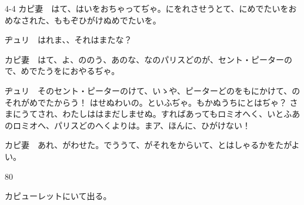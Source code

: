 \documentclass[tate,paper=b6j,jafontsize=9pt]{jlreq}
\begin{document}
\begin{azconvIndented}{4\zw}{-4\zw}
カピ妻　はて、はいをおちゃってぢゃ。にをれさせうとて、にめでたいをおめなされた、ももぞひがけぬめでたいを。

ヂュリ　はれま、、それはまたな？

カピ妻　はて、よ、ののう、あのな、なのパリスどのが、セント・ピーターので、めでたうをにおやるぢゃ。

ヂュリ　そのセント・ピーターのけて、いゝや、ピーターどのをもにかけて、のそれがめでたからう！ はせぬわいの。といふぢゃ。もかぬうちにとはぢゃ？ さまにうてされ、わたしははまだしませぬ。すればあってもロミオへく、いとふあのロミオへ、パリスどのへくよりは。まア、ほんに、ひがけない！

カピ妻　あれ、がわせた。でううて、がそれをからいて、とはしゃるかをたがよい。

\end{azconvIndented}
\begin{azconvIndented}{8\zw}{0\zw}

カピューレットにいて出る。

\end{azconvIndented}
\end{document}

